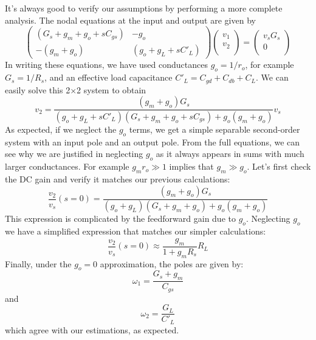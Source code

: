 It's always good to verify our assumptions by performing a more complete analysis.  The nodal equations at the input and output are given by
\begin{equation}
	\begin{pmatrix}
	(G_s + g_m + g_o + s C_{gs})  & - g_o \\
	-(g_m + g_o) & (g_o + g_L + s C'_L)
	\end{pmatrix}
	\begin{pmatrix}
	v_1 \\ v_2 \\
	\end{pmatrix}
	=
	\begin{pmatrix}
	v_s G_s \\ 0 \\
	\end{pmatrix}	
\end{equation}
In writing these equations, we have used conductances $g_o = 1/r_o$, for example $G_s = 1/R_s$, and an effective load capacitance $C'_L = C_{gd} + C_{db} + C_L$.  We can easily solve this 2$\times$2 system to obtain
\begin{equation}
	v_2 = \frac{(g_m + g_o) G_s}
			   {(g_o + g_L + s C'_L)(G_s + g_m + g_o + s C_{gs}) + g_o (g_m + g_o)} v_s
\end{equation}
As expected, if we neglect the $g_o$ terms, we get a simple separable second-order system with an input pole and an output pole.  From the full equations, we can see why we are justified in neglecting $g_o$ as it always appears in sums with much larger conductances.  For example $g_m r_o \gg 1$ implies that $g_m \gg g_o$.  Let's first check the DC gain and verify it matches our previous calculations:
\begin{equation}
	\frac{v_2}{v_s}(s = 0) = 
		  \frac{(g_m + g_o) G_s}
			   {(g_o + g_L)(G_s + g_m + g_o) + g_o (g_m + g_o)} 
\end{equation}
This expression is complicated by the feedforward gain due to $g_o$.  Neglecting $g_o$ we have a simplified expression that matches our simpler calculations:
\begin{equation}
	\frac{v_2}{v_s}(s = 0) \approx \frac{g_m}{1 + g_m R_s} R_L 
\end{equation}
Finally, under the $g_o = 0$ approximation, the poles are given by:
\begin{equation}
	\omega_1 = \frac{G_s + g_m}{C_{gs}}
\end{equation}
and
\begin{equation}
	\omega_2 = \frac{G_L}{C'_{L}}
\end{equation}
which agree with our estimations, as expected.
